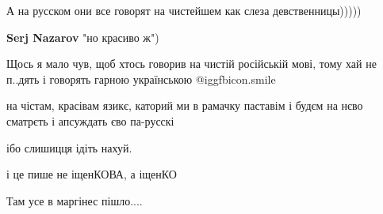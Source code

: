 \begin{itemize}
А на русском они все говорят на чистейшем как слеза девственницы)))))

\begin{itemize}
 
\textbf{Serj Nazarov} "но красиво ж")
\end{itemize}

 
Щось я мало чув, щоб хтось говорив на чистій російській мові, тому хай не п..дять і говорять гарною українською  @igg{fbicon.smile} 

 
на чістам, красівам язикє, каторий ми в рамачку паставім і будєм на нєво сматрєть і апсуждать єво па-русскі

 
ібо слишицця ідіть нахуй.

 
і це пише не іщенКОВА, а іщенКО

 
Там усе в маргінес пішло....


\end{itemize}
